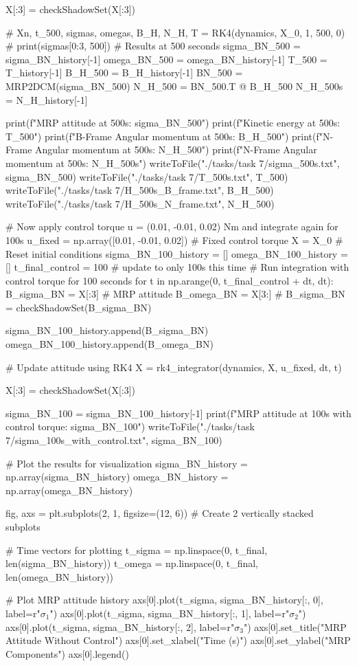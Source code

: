 \documentclass[conf]{new-aiaa}
\begin{document}
\begin{pythoncode}
    X[:3] = checkShadowSet(X[:3])


# Xn, t_500, sigmas, omegas, B_H, N_H, T = RK4(dynamics, X_0, 1, 500, 0)
# print(sigmas[0:3, 500])
# Results at 500 seconds
sigma_BN_500 = sigma_BN_history[-1]
omega_BN_500 = omega_BN_history[-1]
T_500 = T_history[-1]
B_H_500 = B_H_history[-1]
BN_500 = MRP2DCM(sigma_BN_500)
N_H_500 = BN_500.T @ B_H_500
N_H_500s = N_H_history[-1]

print(f"MRP attitude at 500s: {sigma_BN_500}")
print(f"Kinetic energy at 500s: {T_500}")
print(f"B-Frame Angular momentum at 500s: {B_H_500}")
print(f"N-Frame Angular momentum at 500s: {N_H_500}")
print(f"N-Frame Angular momentum at 500s: {N_H_500s}")
writeToFile("./tasks/task 7/sigma_500s.txt", sigma_BN_500)
writeToFile("./tasks/task 7/T_500s.txt", T_500)
writeToFile("./tasks/task 7/H_500s_B_frame.txt", B_H_500)
writeToFile("./tasks/task 7/H_500s_N_frame.txt", N_H_500)


# Now apply control torque u = (0.01, -0.01, 0.02) Nm and integrate again for 100s
u_fixed = np.array([0.01, -0.01, 0.02])  # Fixed control torque
X = X_0  # Reset initial conditions
sigma_BN_100_history = []
omega_BN_100_history = []
t_final_control = 100  # update to only 100s this time
# Run integration with control torque for 100 seconds
for t in np.arange(0, t_final_control + dt, dt):
    B_sigma_BN = X[:3]  # MRP attitude
    B_omega_BN = X[3:]
    # B_sigma_BN = checkShadowSet(B_sigma_BN)

    sigma_BN_100_history.append(B_sigma_BN)
    omega_BN_100_history.append(B_omega_BN)

    # Update attitude using RK4
    X = rk4_integrator(dynamics, X, u_fixed, dt, t)

    X[:3] = checkShadowSet(X[:3])


sigma_BN_100 = sigma_BN_100_history[-1]
print(f"MRP attitude at 100s with control torque: {sigma_BN_100}")
writeToFile("./tasks/task 7/sigma_100s_with_control.txt", sigma_BN_100)

# Plot the results for visualization
sigma_BN_history = np.array(sigma_BN_history)
omega_BN_history = np.array(omega_BN_history)

fig, axs = plt.subplots(2, 1, figsize=(12, 6))  # Create 2 vertically stacked subplots

# Time vectors for plotting
t_sigma = np.linspace(0, t_final, len(sigma_BN_history))
t_omega = np.linspace(0, t_final, len(omega_BN_history))

# Plot MRP attitude history
axs[0].plot(t_sigma, sigma_BN_history[:, 0], label=r"$\sigma_1$")
axs[0].plot(t_sigma, sigma_BN_history[:, 1], label=r"$\sigma_2$")
axs[0].plot(t_sigma, sigma_BN_history[:, 2], label=r"$\sigma_3$")
axs[0].set_title("MRP Attitude Without Control")
axs[0].set_xlabel("Time (s)")
axs[0].set_ylabel("MRP Components")
axs[0].legend()


\end{pythoncode}
\end{document}
